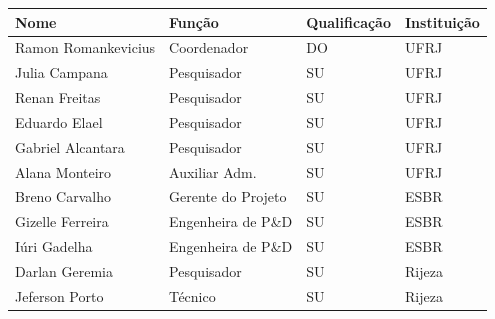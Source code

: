 \begin{onecolumn}
\thispagestyle{empty}


\begin{center}

  
 \vfill



  
  \vspace{0.50cm}



  \begin{center}
    \begin{tabular}{| l | l | l | l |}
    
    \hline
   	 Nome 					& Função			 & Qualificação 	& Instituição	 \\\hline
   	 Ramon Romankevicius 	& Coordenador 	 	 & DO			    & UFRJ  	\\\hline
   	 Julia Campana 			& Pesquisador		 & SU 			    & UFRJ 		\\\hline
   	 Renan Freitas 			& Pesquisador 	 	 & SU 			    & UFRJ 		\\\hline
   	 Eduardo Elael 			& Pesquisador 	 	 & SU 			    & UFRJ		\\\hline
  	 Gabriel Alcantara 		& Pesquisador 	 	 & SU 			    & UFRJ 		\\\hline
   	 Alana Monteiro 		& Auxiliar Adm. 	 & SU 			    & UFRJ 		\\\hline 		
	 Breno Carvalho			& Gerente do Projeto & SU 			    & ESBR 		\\\hline
	 Gizelle Ferreira 		& Engenheira de P\&D & SU 				& ESBR 		\\\hline
	 Iúri Gadelha	 		& Engenheira de P\&D & SU 				& ESBR 		\\\hline
	 Darlan Geremia 		& Pesquisador		 & SU 				& Rijeza 	\\\hline
	 Jeferson Porto  		& Técnico			 & SU 				& Rijeza 	\\\hline
	  
\hline

    
    \hline 
    \end{tabular}
\end{center}

\end{center}
\end{onecolumn}

\newpage

\hypersetup{pageanchor=true}

